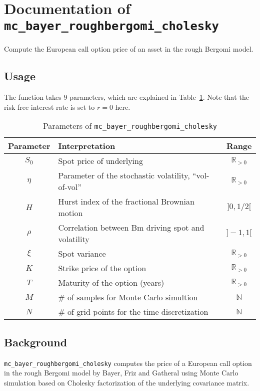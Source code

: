 \documentclass[a4paper]{article}
\newcommand{\R}{\mathbb{R}}
\begin{document}
\section*{Documentation of \texttt{mc\_bayer\_roughbergomi\_cholesky}}
\label{sec:techn-docum-verbmc_b}

Compute the European call option price of an asset in the rough Bergomi model.

\subsection*{Usage}
\label{sec:usage}

The function takes $9$ parameters, which are explained in
Table~\ref{tab:par}. Note that the risk free interest rate is set to $r = 0$ here.

\begin{table}[!htp]
  \centering
  \begin{tabular}{c|l|c}
    Parameter & Interpretation & Range \\
    \hline
    $S_0$ & Spot price of underlying & $\R_{>0}$\\
    $\eta$ & Parameter of the stochastic volatility, ``vol-of-vol'' & $\R_{>0}$\\
    $H$ & Hurst index of the fractional Brownian motion & $]0,1/2[$\\
    $\rho$ & Correlation between Bm driving spot and volatility & $]-1,1[$\\
    $\xi$ & Spot variance & $\R_{>0}$\\
    $K$ & Strike price of the option & $\R_{>0}$\\
    $T$ & Maturity of the option (years) & $\R_{>0}$\\
    $M$ & \# of samples for Monte Carlo simultion & $\mathbb{N}$\\
    $N$ & \# of grid points for the time discretization & $\mathbb{N}$
  \end{tabular}
  \caption{Parameters of \texttt{mc\_bayer\_roughbergomi\_cholesky}}
  \label{tab:par}
\end{table}

\subsection*{Background}
\label{sec:background}

\texttt{mc\_bayer\_roughbergomi\_cholesky} computes the price of a European call option in
the rough Bergomi model by Bayer, Friz and Gatheral \cite{BFG} using Monte Carlo
simulation based on Cholesky factorization of the underlying covariance matrix.
\end{document}
